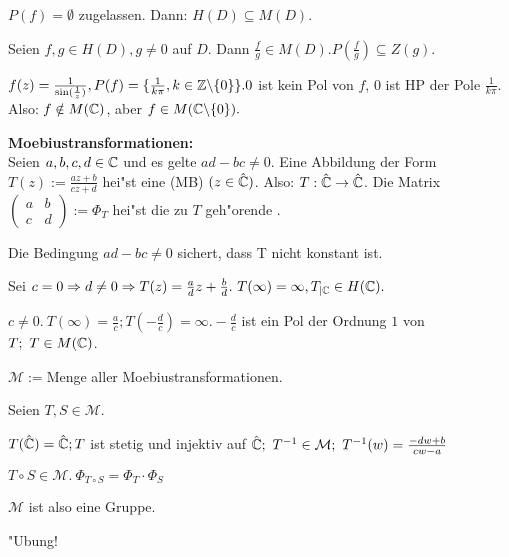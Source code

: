\documentclass[a4paper,twoside,DIV15,BCOR12mm]{scrbook}
\begin{document}
\begin{beispiele}
\item $P(f)= \emptyset$ zugelassen. Dann: $H(D) \subseteq M(D)$.
\item Seien $f,g \in H(D), g \not= 0$ auf $D$. Dann $\frac{f}{g} \in M(D). P(\frac{f}{g}) \subseteq Z(g)$.
\item $f(z) = \frac{1}{\sin(\frac{1}{z})}, P(f)= \{\frac{1}{k\pi}, k \in \mathbb{Z} \backslash \{0\}\}. 0$ ist kein Pol von $f$, $0$ ist HP der Pole $\frac1{k\pi}$. Also: $f \notin M(\mathbb{C})$, aber $f \in M(\mathbb{C} \backslash \{0\}).$
\end{beispiele}

{\bf Moebiustransformationen:}\\
Seien $a,b,c,d \in \mathbb{C}$ und es gelte $ad-bc \not= 0$. Eine Abbildung der Form $T(z) := \frac{az+b}{cz+d}$ hei"st eine  (MB) $(z \in \hat{\mathbb{C}})$. Also: $T: \hat{\mathbb{C}} \rightarrow \hat{\mathbb{C}}$. Die Matrix
$\left( \begin{array}{cc}
a & b \\
c & d
\end{array}
\right) := \Phi_T$ hei"st die zu $T$ geh"orende .

\begin{bemerkungen}
\item Die Bedingung $ad-bc \not= 0$ sichert, dass T nicht konstant ist.
\item Sei $c = 0 \Rightarrow d \not= 0 \Rightarrow T(z) = \frac{a}{d}z + \frac{b}{d}.\ T(\infty) = \infty, T_{|\mathbb{C}} \in H(\mathbb{C}).$
\item $c \not= 0.\ T(\infty) = \frac{a}{c}; T(-\frac{d}{c})=\infty. -\frac{d}{c}$ ist ein Pol der Ordnung $1$ von $T;\ T \in M(\mathbb{C})$.
\end{bemerkungen}
$\mathcal{M} := $Menge aller Moebiustransformationen.

\begin{satz}
Seien $T,S \in \mathcal{M}.$
\begin{liste}
\item $T(\hat{\mathbb{C}}) = \hat{\mathbb{C}}; T$ ist stetig und injektiv auf $\hat{\mathbb{C}};\ T^{-1} \in \mathcal{M};\ T^{-1}(w) = \frac{-dw+b}{cw-a}$
\item $T \circ S \in \mathcal{M}.\ \Phi_{T \circ S} = \Phi_T \cdot \Phi_S$
\end{liste}
$\mathcal{M}$ ist also eine Gruppe.
\end{satz}

\begin{beweis}
"Ubung!
\end{beweis}
\end{document}

